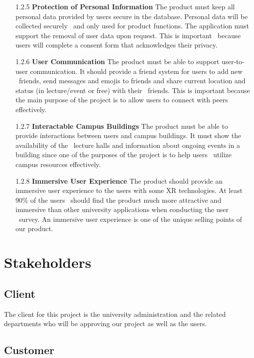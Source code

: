 \documentclass[12pt]{article}
\begin{document}
\begin{itemize}
  \item[1.2.5] \textbf{Protection of Personal Information}
  The product must keep all personal data provided by users secure in the database. Personal data will be collected securely \
  and only used for product functions. The application must support the removal of user data upon request. This is important \
  because users will complete a consent form that acknowledges their privacy.

  \item[1.2.6] \textbf{User Communication}
  The product must be able to support user-to-user communication. It should provide a friend system for users to add new \
  friends, send messages and emojis to friends and share current location and status (in lecture/event or free) with their \
  friends. This is important because the main purpose of the project is to allow users to connect with peers effectively.

  \item[1.2.7] \textbf{Interactable Campus Buildings}
  The product must be able to provide interactions between users and campus buildings. It must show the availability of the \
  lecture halls and information about ongoing events in a building since one of the purposes of the project is to help users \
  utilize campus resources effectively.

  \item[1.2.8] \textbf{Immersive User Experience}
  The product should provide an immersive user experience to the users with some XR technologies. At least 90\% of the users \
  should find the product much more attractive and immersive than other university applications when conducting the user \
  survey. An immersive user experience is one of the unique selling points of our product.

\end{itemize}

\section{Stakeholders}
\subsection{Client}

The client for this project is the university administration and the related departments who will be approving our project as well as the users.

\subsection{Customer}
\end{document}
